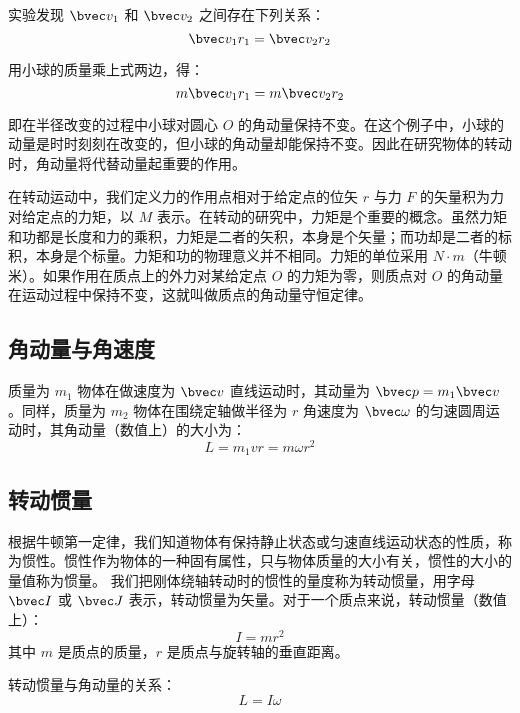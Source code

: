 实验发现 $\bvec v_1$ 和 $\bvec v_2$ 之间存在下列关系：
\begin{equation}
\bvec v_1r_1=\bvec v_2r_2
\end{equation}

用小球的质量乘上式两边，得：
\begin{equation}
m\bvec v_1r_1=m\bvec v_2r_2
\end{equation}

即在半径改变的过程中小球对圆心 $O$ 的角动量保持不变。在这个例子中，小球的动量是时时刻刻在改变的，但小球的角动量却能保持不变。因此在研究物体的转动时，角动量将代替动量起重要的作用。

在转动运动中，我们定义力的作用点相对于给定点的位矢 $r$ 与力 $F$ 的矢量积为力对给定点的力矩，以 $M$ 表示。在转动的研究中，力矩是个重要的概念。虽然力矩和功都是长度和力的乘积，力矩是二者的矢积，本身是个矢量；而功却是二者的标积，本身是个标量。力矩和功的物理意义并不相同。力矩的单位采用 $N\cdot m$（牛顿米）。如果作用在质点上的外力对某给定点 $O$ 的力矩为零，则质点对 $O$ 的角动量在运动过程中保持不变，这就叫做质点的角动量守恒定律。
\subsection{角动量与角速度}
质量为 $m_1$ 物体在做速度为 $\bvec v$ 直线运动时，其动量为 $\bvec p=m_1\bvec v$。同样，质量为 $m_2$ 物体在围绕定轴做半径为 $r$ 角速度为 $\bvec \omega$ 的匀速圆周运动时，其角动量（数值上）的大小为：
\begin{equation}
L=m_1vr=m\omega r^2
\end{equation}
\subsection{转动惯量}
根据牛顿第一定律，我们知道物体有保持静止状态或匀速直线运动状态的性质，称为惯性。惯性作为物体的一种固有属性，只与物体质量的大小有关，惯性的大小的量值称为惯量。
我们把刚体绕轴转动时的惯性的量度称为转动惯量，用字母 $\bvec I$ 或 $\bvec J$ 表示，转动惯量为矢量。对于一个质点来说，转动惯量（数值上）：
\begin{equation}
I=mr^{2}
\end{equation}
其中 $m$ 是质点的质量，$r$ 是质点与旋转轴的垂直距离。

转动惯量与角动量的关系：
\begin{equation}
L=I\omega
\end{equation}


